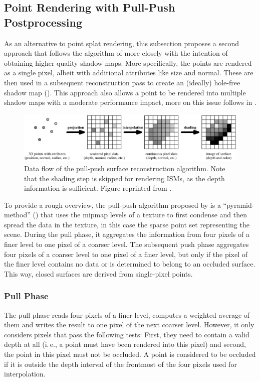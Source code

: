 \subsection{Point Rendering with Pull-Push Postprocessing}

As an alternative to point splat rendering, this subsection proposes a second approach that follows the algorithm of \citet{Marroquim:2007:reconstruction} more closely with the intention of obtaining higher-quality shadow maps. More specifically, the points are rendered as a single pixel, albeit with additional attributes like size and normal. These are then used in a subsequent reconstruction pass to create an (ideally) hole-free shadow map (). This approach also allows a point to be rendered into multiple shadow maps with a moderate performance impact, more on this issue follows in .


\begin{figure}[htb]
\centering
    \includegraphics[width=\textwidth]{graphics/pullpush_dataflow_marroquim}
  \caption{Data flow of the pull-push surface reconstruction algorithm. Note that the shading step is skipped for rendering ISMs, as the depth information is sufficient. Figure reprinted from \citet{Marroquim:2007:reconstruction}.}
  \label{fig:concept:pull_push_dataflow_marroquim}
\end{figure}


To provide a rough overview, the pull-push algorithm proposed by \citet{Marroquim:2007:reconstruction} is a ``pyramid-method'' (\cite{Strengert:2006:Pyramid}) that uses the mipmap levels of a texture to first condense and then spread the data in the texture, in this case the sparse point set representing the scene. During the pull phase, it aggregates the information from four pixels of a finer level to one pixel of a coarser level. The subsequent push phase aggregates four pixels of a coarser level to one pixel of a finer level, but only if the pixel of the finer level contains no data or is determined to belong to an occluded surface. This way, closed surfaces are derived from single-pixel points.


\subsubsection{Pull Phase}
The pull phase reads four pixels of a finer level, computes a weighted average of them and writes the result to one pixel of the next coarser level. However, it only considers pixels that pass the following tests: First, they need to contain a valid depth at all (i.\,e., a point must have been rendered into this pixel) and second, the point in this pixel must not be occluded. A point is considered to be occluded if it is outside the depth interval of the frontmost of the four pixels used for interpolation.

